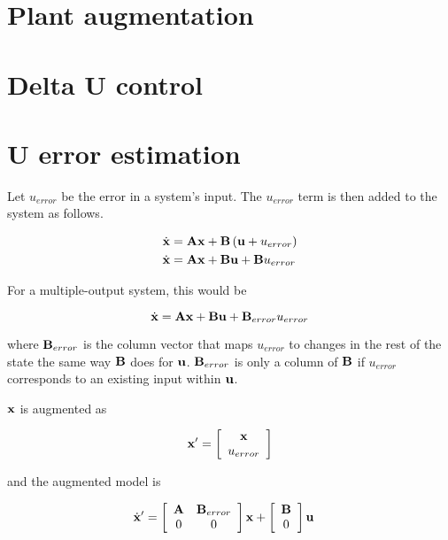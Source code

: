 \section{Plant augmentation}

\section{Delta U control}

\section{U error estimation}

Let $u_{error}$ be the error in a system's input. The $u_{error}$ term is then
added to the system as follows.

\begin{align*}
  \dot{\mathbf{x}} &= \mathbf{A}\mathbf{x} + \mathbf{B}\left(\mathbf{u} + u_{error}\right) \\
  \dot{\mathbf{x}} &= \mathbf{A}\mathbf{x} + \mathbf{B}\mathbf{u} + \mathbf{B}u_{error}
\end{align*}

For a multiple-output system, this would be

\begin{equation*}
  \dot{\mathbf{x}} = \mathbf{A}\mathbf{x} + \mathbf{B}\mathbf{u} + \mathbf{B}_{error}u_{error}
\end{equation*}

where $\mathbf{B}_{error}$ is the column vector that maps $u_{error}$ to changes in
the rest of the state the same way $\mathbf{B}$ does for $\mathbf{u}$.
$\mathbf{B}_{error}$ is only a column of $\mathbf{B}$ if $u_{error}$ corresponds to an
existing input within $\mathbf{u}$.

$\mathbf{x}$ is augmented as

\begin{equation*}
  \mathbf{x'} = \left[
  \begin{array}{c}
    \mathbf{x} \\
    u_{error}
  \end{array}
  \right]
\end{equation*}

and the augmented model is

\begin{align*}
  \dot{\mathbf{x}}' &= \left[
  \begin{array}{cc}
    \mathbf{A} & \mathbf{B}_{error} \\
    0 & 0
  \end{array}
  \right] \mathbf{x} + \left[
  \begin{array}{c}
    \mathbf{B} \\
    0
  \end{array}
  \right] \mathbf{u}
\end{align*}

